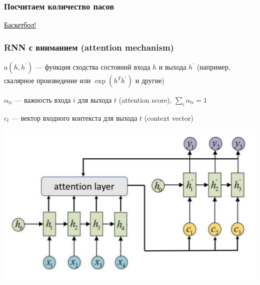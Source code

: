 \documentclass[fullscreen=true, bookmarks=true, hyperref={pdfencoding=unicode}]{beamer}
\begin{document}
\begin{frame}
  \frametitle{Посчитаем количество пасов}

  \href{https://www.youtube.com/watch?v=tkvtGusJt6E}{Баскетбол!}

\end{frame}


\begin{frame}
  \frametitle{RNN с вниманием (attention mechanism)}

  $a(h, h^\prime)$ — функция сходства состояний входа $h$ и выхода $h^\prime$
  (например, скалярное произведение или $\exp(h^T h^\prime)$ и другие)

  \vspace{0.5cm}
  $\alpha_{ti}$ — важность входа $i$ для выхода $t$ (attention score), $\sum_i \alpha_{ti} = 1$

  $c_t$ — вектор входного контекста для выхода $t$ (context vector)

  \begin{center}
    \includegraphics[keepaspectratio,
                   width=.6\paperwidth]{seq2seq_attention.png}
  \end{center}

\end{frame}
\end{document}
